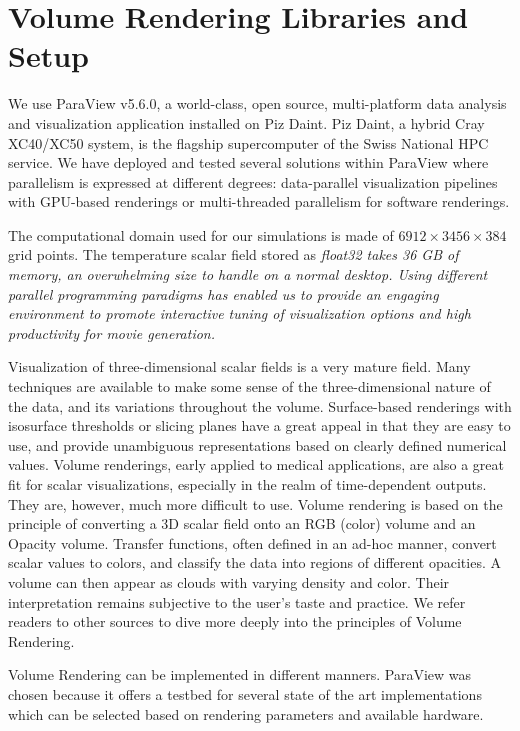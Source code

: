 \documentclass[5p,times]{elsarticle}
\begin{document}
\section{Volume Rendering Libraries and Setup}

We use ParaView v5.6.0, a world-class, open source, multi-platform data analysis and
visualization application installed on Piz Daint. Piz Daint, a hybrid Cray XC40/XC50 system,
is the flagship supercomputer of the Swiss National HPC service. We have deployed
and tested several solutions within ParaView where parallelism is expressed
at different degrees: data-parallel visualization pipelines with GPU-based renderings
or multi-threaded parallelism for software renderings.

The computational domain  used for our simulations is made of $ 6912 \times 3456 \times 384 $ grid points.
The temperature scalar field stored as \it{float32} \rm takes 36 GB of memory, an
overwhelming size to handle on a normal desktop. Using different parallel programming
paradigms has enabled us to provide an engaging environment to promote interactive tuning of
visualization options and high productivity for movie generation.

Visualization of three-dimensional scalar fields is a very mature field. Many techniques are
available to make some sense of the three-dimensional nature of the data, and its variations
throughout the volume. Surface-based renderings with isosurface thresholds or
slicing planes have a great appeal in that they are easy to use, and provide unambiguous
representations based on clearly defined numerical values. Volume renderings, early applied
to medical applications, are also a great fit for scalar visualizations, especially in the
realm of time-dependent outputs. They are, however, much more difficult to use. Volume rendering is
based on the principle of converting a 3D scalar field onto an RGB (color) volume and an Opacity volume.
Transfer functions, often defined in an ad-hoc manner, convert scalar values to colors, and classify
the data into regions of different opacities. A volume can then appear as clouds with varying density and color.
Their interpretation remains subjective to the user's taste and practice.
We refer readers to other sources \cite{VTKTextbook} to dive more deeply into the principles of Volume Rendering.

Volume Rendering can be implemented in different manners. ParaView was chosen because it offers a testbed
for several state of the art implementations which can be selected based on rendering parameters and
available hardware.
\end{document}
